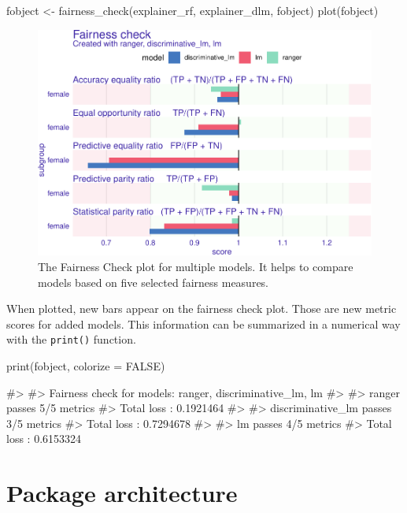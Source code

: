 \begin{Schunk}
\begin{Sinput}
fobject <- fairness_check(explainer_rf, explainer_dlm, fobject)
plot(fobject)
\end{Sinput}
\begin{figure}

{\centering \includegraphics[width=0.75\linewidth]{Wisniewski-Biecek_files/figure-latex/fairness-plot-3-1} 

}

\caption[The Fairness Check plot for multiple models]{The Fairness Check plot for multiple models. It helps to compare models based on five selected fairness measures. }\label{fig:fairness-plot-3}
\end{figure}
\end{Schunk}

When plotted, new bars appear on the fairness check plot. Those are new
metric scores for added models. This information can be summarized in a
numerical way with the \texttt{print()} function.

\begin{Schunk}
\begin{Sinput}
print(fobject, colorize = FALSE)
\end{Sinput}
\begin{Soutput}
#> 
#> Fairness check for models: ranger, discriminative_lm, lm 
#> 
#> ranger passes 5/5 metrics
#> Total loss :  0.1921464 
#> 
#> discriminative_lm passes 3/5 metrics
#> Total loss :  0.7294678 
#> 
#> lm passes 4/5 metrics
#> Total loss :  0.6153324
\end{Soutput}
\end{Schunk}

\hypertarget{package-architecture}{%
\section{Package architecture}\label{package-architecture}}

